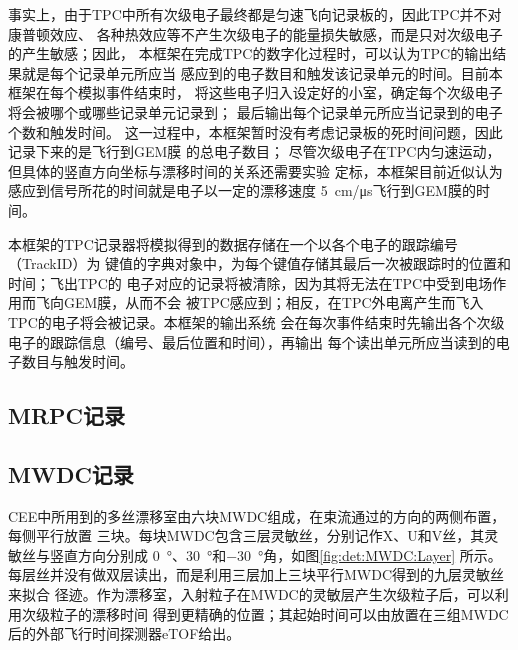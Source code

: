 \documentclass[bachelor,openany,oneside,color]{buaathesis}
\begin{document}
事实上，由于TPC中所有次级电子最终都是匀速飞向记录板的，因此TPC并不对康普顿效应、
各种热效应等不产生次级电子的能量损失敏感，而是只对次级电子的产生敏感；因此，
本框架在完成TPC的数字化过程时，可以认为TPC的输出结果就是每个记录单元所应当
感应到的电子数目和触发该记录单元的时间。目前本框架在每个模拟事件结束时，
将这些电子归入设定好的小室，确定每个次级电子将会被哪个或哪些记录单元记录到；
最后输出每个记录单元所应当记录到的电子个数和触发时间。
这一过程中，本框架暂时没有考虑记录板的死时间问题，因此记录下来的是飞行到GEM膜
的总电子数目；
尽管次级电子在TPC内匀速运动，但具体的竖直方向坐标与漂移时间的关系还需要实验
定标，本框架目前近似认为感应到信号所花的时间就是电子以一定的漂移速度
\SI{5}{\centi\meter/\micro\second}飞行到GEM膜的时间。

本框架的TPC记录器将模拟得到的数据存储在一个以各个电子的跟踪编号（TrackID）为
键值的字典对象中，为每个键值存储其最后一次被跟踪时的位置和时间；飞出TPC的
电子对应的记录将被清除，因为其将无法在TPC中受到电场作用而飞向GEM膜，从而不会
被TPC感应到；相反，在TPC外电离产生而飞入TPC的电子将会被记录。本框架的输出系统
会在每次事件结束时先输出各个次级电子的跟踪信息（编号、最后位置和时间），再输出
每个读出单元所应当读到的电子数目与触发时间。

\subsection{MRPC记录}\label{ssec:digi:MRPC}



\subsection{MWDC记录}\label{ssec:digi:MWDC}

CEE中所用到的多丝漂移室由六块MWDC组成，在束流通过的方向的两侧布置，每侧平行放置
三块。每块MWDC包含三层灵敏丝，分别记作X、U和V丝，其灵敏丝与竖直方向分别成
\SI{0}{\degree}、\SI{30}{\degree}和\SI{-30}{\degree}角，如图\ref{fig:det:MWDC:Layer}
所示。每层丝并没有做双层读出，而是利用三层加上三块平行MWDC得到的九层灵敏丝来拟合
径迹。作为漂移室，入射粒子在MWDC的灵敏层产生次级粒子后，可以利用次级粒子的漂移时间
得到更精确的位置；其起始时间可以由放置在三组MWDC后的外部飞行时间探测器eTOF给出。
\end{document}
